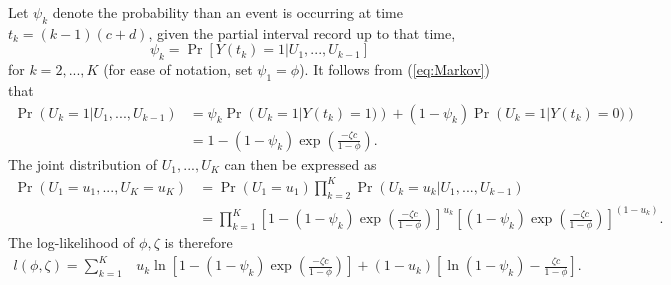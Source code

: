 \documentclass[man, noextraspace, floatsintext]{apa6}\usepackage[]{graphicx}\usepackage[]{color}
\begin{document}
Let $\psi_k$ denote the probability than an event is occurring at time $t_k = (k-1)(c + d)$, given the partial interval record up to that time, 
\begin{equation}
\psi_k = \Pr\left[Y(t_k) = 1 \left| U_1,...,U_{k-1}\right.\right]
\end{equation}
for $k = 2,...,K$ (for ease of notation, set $\psi_1 = \phi$). It follows from (\ref{eq:Markov}) that 
\begin{align*}
\Pr\left(U_k = 1 \left| U_1,...,U_{k-1}\right.\right) &= \psi_k \Pr\left(U_k = 1 \left| Y(t_k) = 1)\right.\right)  + (1 - \psi_k)\Pr\left(U_k = 1 \left| Y(t_k) = 0)\right.\right) \\
&= 1 - (1 - \psi_k)\exp\left( \frac{-\zeta c}{1 - \phi}\right).
\end{align*}
The joint distribution of $U_1,...,U_K$ can then be expressed as 
\begin{align}
\Pr\left(U_1=u_1,...,U_K = u_K\right) &= \Pr\left(U_1=u_1\right) \prod_{k=2}^K \Pr\left(U_k=u_k \left| U_1,...,U_{k-1}\right.\right) \nonumber \\
&= \prod_{k=1}^K \left[1 - (1 - \psi_k)\exp\left( \frac{-\zeta c}{1 - \phi}\right) \right]^{u_k} \left[(1 - \psi_k)\exp\left( \frac{-\zeta c}{1 - \phi}\right)\right]^{(1 - u_k)}.
\end{align}
The log-likelihood of $\phi, \zeta$ is therefore 
\begin{align}
\label{eq:log_lik}
l\left(\phi,\zeta\right) = \sum_{k=1}^K & u_k \ln\left[1 - (1 - \psi_k)\exp\left( \frac{-\zeta c}{1 - \phi}\right)\right]  + (1 - u_k)\left[\ln\left(1 - \psi_k \right) - \frac{\zeta c}{1 - \phi}\right].
\end{align}
\end{document}
